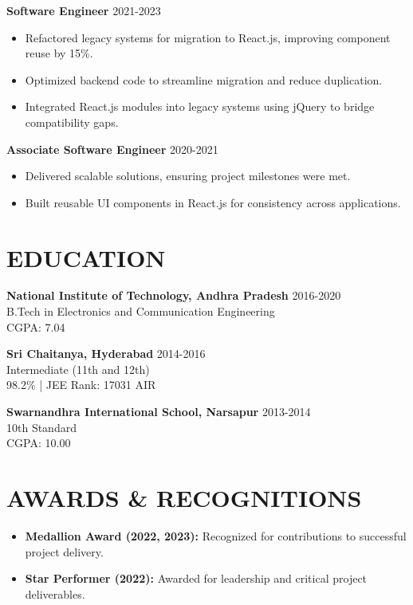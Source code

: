 \documentclass[a4paper,10pt]{article}
\begin{document}
\noindent
\textbf{Software Engineer} \hfill 2021-2023
\begin{itemize}
    \item Refactored legacy systems for migration to React.js, improving component reuse by 15\%.
    \item Optimized backend code to streamline migration and reduce duplication.
    \item Integrated React.js modules into legacy systems using jQuery to bridge compatibility gaps.
\end{itemize}

\noindent
\textbf{Associate Software Engineer} \hfill 2020-2021
\begin{itemize}
    \item Delivered scalable solutions, ensuring project milestones were met.
    \item Built reusable UI components in React.js for consistency across applications.
\end{itemize}

\section*{EDUCATION}
\noindent
\textbf{National Institute of Technology, Andhra Pradesh} \hfill 2016-2020 \\
B.Tech in Electronics and Communication Engineering \\
CGPA: 7.04

\noindent
\textbf{Sri Chaitanya, Hyderabad} \hfill 2014-2016 \\
Intermediate (11th and 12th) \\
98.2\% | JEE Rank: 17031 AIR

\noindent
\textbf{Swarnandhra International School, Narsapur} \hfill 2013-2014 \\
10th Standard \\
CGPA: 10.00

\section*{AWARDS \& RECOGNITIONS}
\begin{itemize}
    \item \textbf{Medallion Award (2022, 2023):} Recognized for contributions to successful project delivery.
    \item \textbf{Star Performer (2022):} Awarded for leadership and critical project deliverables.
\end{itemize}
\end{document}
